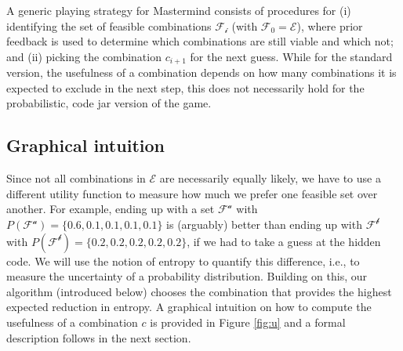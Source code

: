 \documentclass[12pt]{article}
\begin{document}
A generic playing strategy for Mastermind consists of procedures for (i) identifying the set of feasible combinations $\mathcal{F_i}$ (with $\mathcal{F_0}=\mathcal{E}$), where prior feedback is used to determine which combinations are still viable and which not; and (ii) picking the combination $c_{i+1}$ for the next guess. While for the standard version, the usefulness of a combination depends on how many combinations it is expected to exclude in the next step, this does not necessarily hold for the probabilistic, code jar version of the game. 

\subsection{Graphical intuition}

Since not all combinations in $\mathcal{E}$ are necessarily equally likely, we have to use a different utility function to measure how much we prefer one feasible set over another. For example, ending up with a set $\mathcal{F^a}$ with $P(\mathcal{F^a})=\{0.6, 0.1, 0.1, 0.1, 0.1\}$ is (arguably) better than ending up with $\mathcal{F^b}$ with $P(\mathcal{F^b})=\{0.2, 0.2, 0.2, 0.2, 0.2\}$, if we had to take a guess at the hidden code. We will use the notion of entropy to quantify this difference, i.e., to measure the uncertainty of a probability distribution. Building on this, our algorithm (introduced below) chooses the combination that provides the highest expected reduction in entropy. A graphical intuition on how to compute the usefulness of a combination $c$ is provided in Figure \ref{fig:u} and a formal description follows in the next section. 
\end{document}
